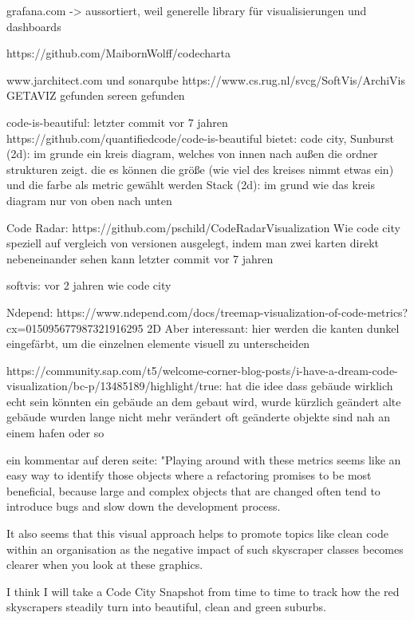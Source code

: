 grafana.com -> aussortiert, weil generelle library für visualisierungen und dashboards


https://github.com/MaibornWolff/codecharta

www.jarchitect.com und sonarqube
https://www.cs.rug.nl/svcg/SoftVis/ArchiVis
GETAVIZ gefunden
sereen gefunden

code-is-beautiful: letzter commit vor 7 jahren
https://github.com/quantifiedcode/code-is-beautiful
bietet: code city, 
Sunburst (2d): im grunde ein kreis diagram, welches von  innen nach außen die ordner strukturen zeigt. die es können die größe (wie viel des kreises nimmt etwas ein) und die farbe als metric gewählt werden
Stack (2d): im grund wie das kreis diagram nur von oben nach unten


Code Radar:
https://github.com/pschild/CodeRadarVisualization
Wie code city speziell auf vergleich von versionen ausgelegt, indem man zwei karten direkt nebeneinander sehen kann
letzter commit vor 7 jahren


softvis:
vor 2 jahren
wie code city


Ndepend:
https://www.ndepend.com/docs/treemap-visualization-of-code-metrics?cx=015095677987321916295%
2D
Aber interessant: hier werden die kanten dunkel eingefärbt, um die einzelnen elemente visuell zu unterscheiden


https://community.sap.com/t5/welcome-corner-blog-posts/i-have-a-dream-code-visualization/bc-p/13485189/highlight/true:
hat die idee dass gebäude wirklich echt sein könnten
ein gebäude an dem gebaut wird, wurde kürzlich geändert
alte gebäude wurden lange nicht mehr verändert
oft geänderte objekte sind nah an einem hafen oder so

ein kommentar auf deren seite:
"Playing around with these metrics seems like an easy way to identify those objects where a refactoring promises to be most beneficial, because large and complex objects that are changed often tend to introduce bugs and slow down the development process.

It also seems that this visual approach helps to promote topics like clean code within an organisation as the negative impact of such skyscraper classes becomes clearer when you look at these graphics.

I think I will take a Code City Snapshot from time to time to track how the red skyscrapers steadily turn into beautiful, clean and green suburbs.

